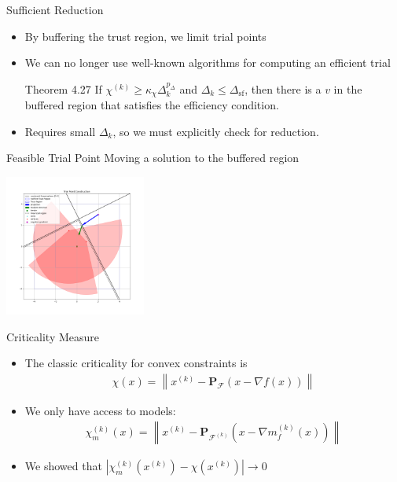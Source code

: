 \documentclass{beamer}
\newcommand{\xk}{{{x}^{(k)}}}
\newcommand{\feasible}{\mathcal F}
\newcommand{\feasiblek}{\mathcal F^{(k)}}
\newcommand{\proj}{\textbf{P}}
\begin{document}
\begin{frame}{Sufficient Reduction}
	\begin{itemize}
		\item By buffering the trust region, we limit trial points
		\item We can no longer use well-known algorithms for computing an efficient trial
		\begin{block}{Theorem 4.27}
			If $\chi^{(k)} \ge \kappa_{\chi} \Delta_k^{p_{\Delta}}$ and $\Delta_k \le \Delta_{\textrm{sf}}$,
			then there is a $v$ in the buffered region that satisfies the efficiency condition.
		\end{block}
		\item Requires small $\Delta_k$, so we must explicitly check for reduction.
		
	\end{itemize}
\end{frame}


\begin{frame}{Feasible Trial Point}
	Moving a solution to the buffered region
	\begin{center}
		\includegraphics[width=175px]{images/trial_point_constructions.png}
	\end{center}
\end{frame}


\begin{frame}{Criticality Measure}
	\begin{itemize}
		\item The classic criticality for convex constraints is
\begin{align*}
\chi(x) = \left\|\xk - \proj_{\feasible}\left(x - \nabla f(x)\right)\right\|
\end{align*}
		\item We only have access to models:
\begin{align*}
\chi_m^{(k)}(x) = \left\|\xk - \proj_{\feasiblek}\left(x - \nabla m_f^{(k)}(x)\right)\right\|
\end{align*}
		\item We showed that $\left|\chi_m^{(k)}\left(\xk\right) - \chi\left(\xk\right)\right| \to 0$ 
	\end{itemize}
\end{frame}
\end{document}
